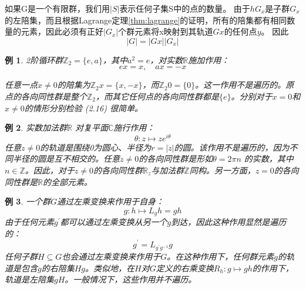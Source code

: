 \documentclass[hyperref,UTF8]{ctexbook}
\newtheorem{eg}{例}[chapter]
\begin{document}
如果G是一个有限群，我们用$|S|$表示任何子集S中的点的数量。 由于$h G_{x}$是子群$G_{x}$的左陪集，而且根据Lagrange定理\ref{thm:lagrange}的证明，所有的陪集都有相同数量的元素，因此必须有正好$\left|G_{x}\right|$个群元素将x映射到其轨道$G x$的任何点$y$。 因此
\begin{equation} \label{eq:2.16}  
    |G|=|G x|\left|G_{x}\right| 
\end{equation}
\begin{eg}
2阶循环群$\mathbb{Z}_{2}=\{e, a\}$，其中$a^{2}=e$，对实数$\mathbb{R}$施加作用：
$$
e x=x, \quad a x=-x
$$

任意一点$x \neq 0$的陪集为$\mathbb{Z}_{2} x=\{x,-x\}$，而$\mathbb{Z}_{2} 0=\{0\}$。这一作用不是遍历的。原点的各向同性群是整个$\mathbb{Z}_{2}$，而其它任何点的各向同性群都是$\{e\}$。分别对于$x=0$和$x \neq 0$的情形分别检验 (2.16) 很简单。
\end{eg}
\begin{eg}
    实数加法群$\mathbb{R}$ 对复平面$\mathbb{C}$施行作用：
$$
\theta: z \mapsto z e^{i \theta}
$$
任意$z \neq 0$的轨道是围绕0为圆心、半径为$r=|z|$的圆。该作用不是遍历的，因为不同半径的圆是互不相交的。任意$z \neq 0$的各向同性群是形如$\theta=2 \pi n$ 的实数，其中$n \in \mathbb{Z}$。因此，对于$z \neq 0$的各向同性群$\mathbb{R}_{z}$与加法群$\mathbb{Z}$同构。另一方面，$z=0$的各向同性群是$\mathbb{R}$的全部元素。
\end{eg}
\begin{eg}
 一个群$G$通过左乘变换来作用于自身：
$$
g: h \mapsto L_{g} h=g h
$$
由于任何元素$g^{\prime}$都可以通过左乘变换从另一个$g$到达，因此这种作用显然是遍历的：
$$
g^{\prime}=L_{g^{\prime} g^{-1}} g
$$
任何子群$H \subseteq G$也会通过左乘变换来作用于$G$。在这种作用下，任何群元素$g$的轨道是包含$g$的右陪集$H g$。类似地，在$H$对$G$定义的右乘变换$R_{h}: g \mapsto g h$的作用下，轨道是左陪集$g H$。一般情况下，这些作用并不遍历。
\end{eg}
\end{document}
